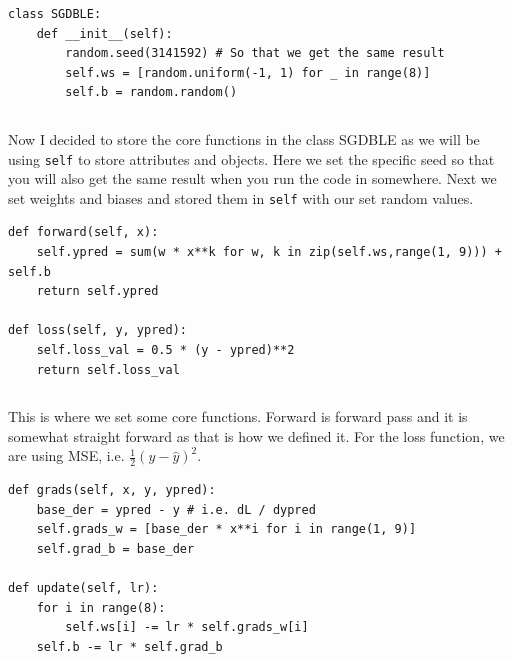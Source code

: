 \documentclass[../../main.tex]{subfiles}
\begin{document}
\begin{jupyter}
\begin{lstlisting}[style=jin]
class SGDBLE:
    def __init__(self):
        random.seed(3141592) # So that we get the same result
        self.ws = [random.uniform(-1, 1) for _ in range(8)]
        self.b = random.random()
\end{lstlisting}
\begin{lstlisting}[style=jout]
\end{lstlisting}
\end{jupyter}

Now I decided to store the core functions in the class SGDBLE
as we will be using \verb|self| to store attributes and objects.
Here we set the specific seed so that you will also get the same
result when you run the code in somewhere. Next we set weights
and biases and stored them in \verb|self| with our set random values.

\begin{jupyter}
\begin{lstlisting}[style=jin]
def forward(self, x):
    self.ypred = sum(w * x**k for w, k in zip(self.ws,range(1, 9))) + self.b
    return self.ypred

def loss(self, y, ypred):
    self.loss_val = 0.5 * (y - ypred)**2
    return self.loss_val
\end{lstlisting}
\begin{lstlisting}[style=jout]
\end{lstlisting}
\end{jupyter}

This is where we set some core functions. Forward is forward pass
and it is somewhat straight forward as that is how we defined it.
For the loss function, we are using MSE, i.e. $\frac{1}{2} (y -
\hat{y})^2$.

\begin{jupyter}
\begin{lstlisting}[style=jin]
def grads(self, x, y, ypred):
    base_der = ypred - y # i.e. dL / dypred
    self.grads_w = [base_der * x**i for i in range(1, 9)]
    self.grad_b = base_der

def update(self, lr):
    for i in range(8):
        self.ws[i] -= lr * self.grads_w[i]
    self.b -= lr * self.grad_b
\end{lstlisting}
\begin{lstlisting}[style=jout]
\end{lstlisting}
\end{jupyter}
\end{document}
